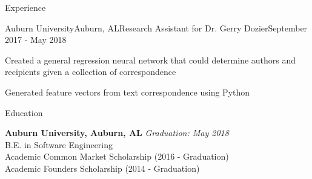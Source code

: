 \documentclass{resume} %
\begin{document}
\begin{rSection}{Experience}

\begin{rSubsection}{Auburn University}{Auburn, AL}{Research Assistant for Dr. Gerry Dozier}{September 2017 - May 2018}
\item Created a general regression neural network that could determine authors and recipients given a collection of correspondence
\item Generated feature vectors from text correspondence using Python
\end{rSubsection}



\end{rSection}


\begin{rSection}{Education}

{\bf Auburn University, Auburn, AL} \hfill {\em Graduation: May 2018} \\ 
B.E. in Software Engineering \\
Academic Common Market Scholarship (2016 - Graduation) \\
Academic Founders Scholarship (2014 - Graduation)\\

\end{rSection}

\end{document}
